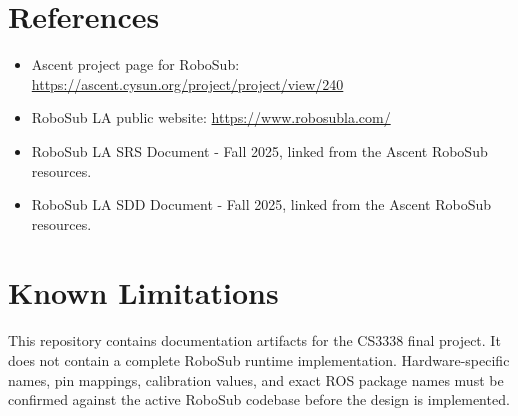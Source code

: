 \documentclass[12pt]{article}
\begin{document}
\section{References}
\begin{itemize}[leftmargin=*]
  \item Ascent project page for RoboSub: \url{https://ascent.cysun.org/project/project/view/240}
  \item RoboSub LA public website: \url{https://www.robosubla.com/}
  \item RoboSub LA SRS Document - Fall 2025, linked from the Ascent RoboSub resources.
  \item RoboSub LA SDD Document - Fall 2025, linked from the Ascent RoboSub resources.
\end{itemize}

\section{Known Limitations}
This repository contains documentation artifacts for the CS3338 final project. It does not contain a complete RoboSub runtime implementation. Hardware-specific names, pin mappings, calibration values, and exact ROS package names must be confirmed against the active RoboSub codebase before the design is implemented.
\end{document}
